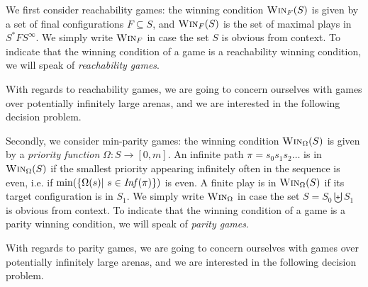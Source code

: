 \documentclass[a4paper,UKenglish,cleveref, autoref, thm-restate]{lipics-v2021}
\newcommand{\problemx}[3]{
	\vspace{0.2cm}
\par\noindent\underline{\sc#1}\par\nobreak\vskip.2\baselineskip
\begingroup\clubpenalty10000\widowpenalty10000
\setbox0\hbox{\bf INPUT:\ }\setbox1\hbox{\bf QUESTION:\ }
\dimen0=\wd0\ifnum\wd1>\dimen0\dimen0=\wd1\fi
\vskip-\parskip\noindent
\hbox to\dimen0{\box0\hfil}\hangindent\dimen0\hangafter1\ignorespaces#2\par
\vskip-\parskip\noindent
\hbox to\dimen0{\box1\hfil}\hangindent\dimen0\hangafter1\ignorespaces#3\par
\endgroup
	\vspace{-0.2cm}
}
\newcommand{\win}{\textsc{Win}}
\begin{document}

We first consider reachability games: 
the winning condition $\win_F(S)$ is given by a set of final configurations
$F \subseteq S$, and $\win_F(S)$ is the set of maximal plays in $S^* F S^\infty$. 
We simply write
$\win_F$ in case the set $S$ is obvious from context.
To indicate that the winning condition of a game is a reachability winning condition, we will speak of {\em reachability games}. 


With regards to reachability games, we are going to concern ourselves with games over potentially infinitely large arenas, and we are interested in the following decision problem.






Secondly, we consider min-parity games: 
the winning condition $\win_\Omega(S)$ is given by a {\em priority function} 
 $\Omega : S \to  [0, m]$.
An infinite path $ \pi = s_0 s_1 s_2 \ldots$ is in $\win_\Omega(S)$ if the smallest priority appearing infinitely often in
the sequence 
 is even, i.e.
if $\min( \{ \Omega(s) | ~ s \in \text{\textit{Inf}}( \pi) \})$ is even. 
A finite play is in $\win_\Omega(S)$ if its target configuration is in $S_1$.
We simply write
$\win_\Omega$ in case the set $S = S_0 \biguplus S_1$ is obvious from context.
To indicate that the winning condition of a game is a parity winning condition, we will speak of
 {\em parity games}. 


With regards to parity games, we are going to concern ourselves with games over potentially infinitely large arenas, and we are interested in the following decision problem. 
\end{document}
